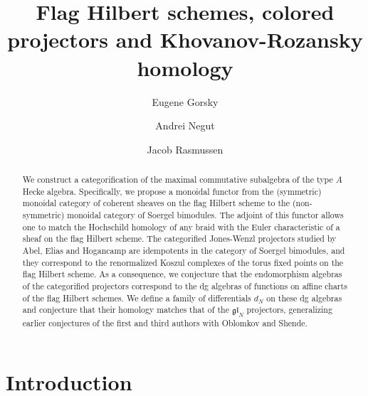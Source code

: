 \documentclass[12pt]{amsart}
\author{Eugene Gorsky}
\author{Andrei Negu\cb t}
\author{Jacob Rasmussen}
\title{Flag Hilbert schemes, colored projectors and Khovanov-Rozansky homology}
\numberwithin{equation}{section}
\theoremstyle{definition}
\theoremstyle{remark}
\newcommand{\CHa}{\mathcal{H}^{\mathrm{alg}}}
\renewcommand{\1}{\mathbf{1}}
\newcommand{\fgl}{\mathfrak{gl}}
\begin{document}
\begin{abstract}

We construct a categorification of the maximal commutative subalgebra of the type $A$ Hecke algebra. Specifically, we propose a monoidal functor from the (symmetric) monoidal category of coherent sheaves on the flag Hilbert scheme to the (non-symmetric) monoidal category of Soergel bimodules. The adjoint of this functor allows one to match the Hochschild homology of any braid with the Euler characteristic of a sheaf on the flag Hilbert scheme. The categorified Jones-Wenzl projectors studied by Abel, Elias and Hogancamp are idempotents in the category of Soergel bimodules, and they correspond to the renormalized Koszul complexes of the torus fixed points on the flag Hilbert scheme. As a consequence, we conjecture that the endomorphism algebras of the categorified projectors correspond to the dg algebras of functions on affine charts of the flag Hilbert schemes. We define a family of differentials $d_{N}$ on these dg algebras and conjecture that their homology matches that of the $\fgl_N$  projectors, generalizing earlier conjectures of the first and third authors with Oblomkov and Shende.
\end{abstract}


\maketitle

\section{Introduction}
\end{document}
